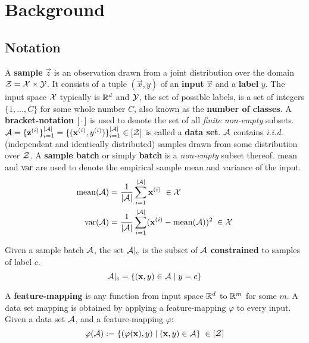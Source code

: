 

\chapter{Background}
\label{chap:Background}

\section{Notation}

A \textbf{sample} $\vec z$ is an observation drawn from a joint distribution over the domain $\mathcal Z = \mathcal X \times \mathcal Y$. 
It consists of a tuple $(\vec x, y)$ of an \textbf{input} $\vec x$ and a \textbf{label} $y$. 
The input space $\mathcal X$ typically is $\mathbb{R}^d$ and $\mathcal Y$, the set of possible labels, is a set of integers $\{1, \dots, C\}$ for some whole number $C$, also known as the \textbf{number of classes}.
A \textbf{bracket-notation} $[\, \cdot \,]$ is used to denote the set of all \textit{finite non-empty} subsets.
$\mathcal A = \{\mathbf z^{(i)}\}_{i=1}^{| \mathcal A |} = \{(\mathbf x^{(i)}, y^{(i)})\}_{i=1}^{| \mathcal A |} \in [\mathcal Z]$ is called a \textbf{data set}. $\mathcal A $ contains \textit{i.i.d.} (independent and identically distributed) samples drawn from some distribution over $\mathcal Z$.
A \textbf{sample batch} or simply \textbf{batch} is a \textit{non-empty} subset thereof.
$\operatorname{mean}$ and $\operatorname{var}$ are used to denote the empirical sample mean and variance of the input.
\begin{align}
    \operatorname{mean} ({\mathcal A}) &= \frac 1 {\lvert \mathcal A \rvert} \sum _{i=1}^{\lvert \mathcal A \rvert} \mathbf x^{(i)} \; \in \mathcal X
    \label{eqn:sample_mean} \\
    \operatorname{var} ({\mathcal A}) &= \frac 1 {\lvert \mathcal A \rvert} \sum _{i=1}^{\lvert \mathcal A \rvert} (\mathbf x^{(i)} - \operatorname{mean} ({\mathcal A}))^2 \; \in \mathcal X 
    \label{eqn:sample_var} 
\end{align}


Given a sample batch $\mathcal A$, the set $\mathcal A|_c$ is the subset of $\mathcal A$ \textbf{constrained} to samples of label $c$.
\begin{equation}
    \mathcal A|_c = \{(\mathbf x, y) \in \mathcal A \mid y = c\}
    \label{eqn:class_constrained}
\end{equation}

A \textbf{feature-mapping} is any function from input space $\mathbb{R}^d$ to $\mathbb{R}^m$ for some $m$.
A data set mapping is obtained by applying a feature-mapping $\varphi$ to every input. Given a data set $\mathcal A$, and a feature-mapping $\varphi$:
\begin{equation}
    \varphi(\mathcal A) := \{(\varphi(\mathbf x), y) \mid (\mathbf x, y) \in \mathcal A\} \;
    \in [\mathcal Z]
    \label{eqn:feature_mapping}
\end{equation}



